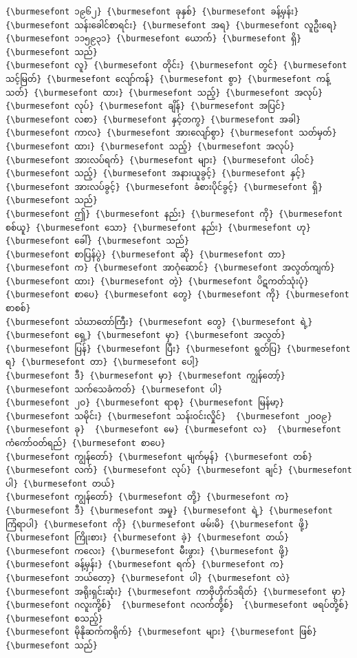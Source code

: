 \documentclass[11pt]{article}
\begin{document}
    \begin{Verbatim}[commandchars=\\\{\}]
{\burmesefont ၁၉၆၂} {\burmesefont ခုနှစ်} {\burmesefont ခန့်မှန်း} {\burmesefont သန်းခေါင်စာရင်း} {\burmesefont အရ} {\burmesefont လူဦးရေ} {\burmesefont ၁၁၅၉၃၁} {\burmesefont ယောက်} {\burmesefont ရှိ} {\burmesefont သည်}
{\burmesefont လူ} {\burmesefont တိုင်း} {\burmesefont တွင်} {\burmesefont သင့်မြတ်} {\burmesefont လျော်ကန်} {\burmesefont စွာ} {\burmesefont ကန့်သတ်} {\burmesefont ထား} {\burmesefont သည့်} {\burmesefont အလုပ်} {\burmesefont လုပ်} {\burmesefont ချိန်} {\burmesefont အပြင်}
{\burmesefont လစာ} {\burmesefont နှင့်တကွ} {\burmesefont အခါ} {\burmesefont ကာလ} {\burmesefont အားလျော်စွာ} {\burmesefont သတ်မှတ်} {\burmesefont ထား} {\burmesefont သည့်} {\burmesefont အလုပ်} {\burmesefont အားလပ်ရက်} {\burmesefont များ} {\burmesefont ပါဝင်}
{\burmesefont သည့်} {\burmesefont အနားယူခွင့်} {\burmesefont နှင့်} {\burmesefont အားလပ်ခွင့်} {\burmesefont ခံစားပိုင်ခွင့်} {\burmesefont ရှိ} {\burmesefont သည်}
{\burmesefont ဤ} {\burmesefont နည်း} {\burmesefont ကို} {\burmesefont စစ်ယူ} {\burmesefont သော} {\burmesefont နည်း} {\burmesefont ဟု} {\burmesefont ခေါ်} {\burmesefont သည်}
{\burmesefont စာပြန်ပွဲ} {\burmesefont ဆို} {\burmesefont တာ} {\burmesefont က} {\burmesefont အာဂုံဆောင်} {\burmesefont အလွတ်ကျက်} {\burmesefont ထား} {\burmesefont တဲ့} {\burmesefont ပိဋကတ်သုံးပုံ} {\burmesefont စာပေ} {\burmesefont တွေ} {\burmesefont ကို} {\burmesefont စာစစ်}
{\burmesefont သံဃာတော်ကြီး} {\burmesefont တွေ} {\burmesefont ရဲ့} {\burmesefont ရှေ့} {\burmesefont မှာ} {\burmesefont အလွတ်} {\burmesefont ပြန်} {\burmesefont ပြီး} {\burmesefont ရွတ်ပြ} {\burmesefont ရ} {\burmesefont တာ} {\burmesefont ပေါ့}
{\burmesefont ဒီ} {\burmesefont မှာ} {\burmesefont ကျွန်တော့်} {\burmesefont သက်သေခံကတ်} {\burmesefont ပါ}
{\burmesefont ၂ဝ} {\burmesefont ရာစု} {\burmesefont မြန်မာ့} {\burmesefont သမိုင်း} {\burmesefont သန်းဝင်းလှိုင်}  {\burmesefont ၂ဝဝ၉} {\burmesefont ခု}  {\burmesefont မေ} {\burmesefont လ}  {\burmesefont ကံကော်ဝတ်ရည်} {\burmesefont စာပေ}
{\burmesefont ကျွန်တော်} {\burmesefont မျက်မှန်} {\burmesefont တစ်} {\burmesefont လက်} {\burmesefont လုပ်} {\burmesefont ချင်} {\burmesefont ပါ} {\burmesefont တယ်}
{\burmesefont ကျွန်တော်} {\burmesefont တို့} {\burmesefont က} {\burmesefont ဒီ} {\burmesefont အမှု} {\burmesefont ရဲ့} {\burmesefont ကြံရာပါ} {\burmesefont ကို} {\burmesefont ဖမ်းမိ} {\burmesefont ဖို့} {\burmesefont ကြိုးစား} {\burmesefont ခဲ့} {\burmesefont တယ်}
{\burmesefont ကလေး} {\burmesefont မီးဖွား} {\burmesefont ဖို့} {\burmesefont ခန့်မှန်း} {\burmesefont ရက်} {\burmesefont က} {\burmesefont ဘယ်တော့} {\burmesefont ပါ} {\burmesefont လဲ}
{\burmesefont အရိုးရှင်းဆုံး} {\burmesefont ကာဗိုဟိုက်ဒရိတ်} {\burmesefont မှာ} {\burmesefont ဂလူးကို့စ်}  {\burmesefont ဂလက်တို့စ်}  {\burmesefont ဖရပ်တို့စ်} {\burmesefont စသည့်}
{\burmesefont မိုနိုဆက်ကရိုက်} {\burmesefont များ} {\burmesefont ဖြစ်} {\burmesefont သည်}
    \end{Verbatim}
\end{document}
